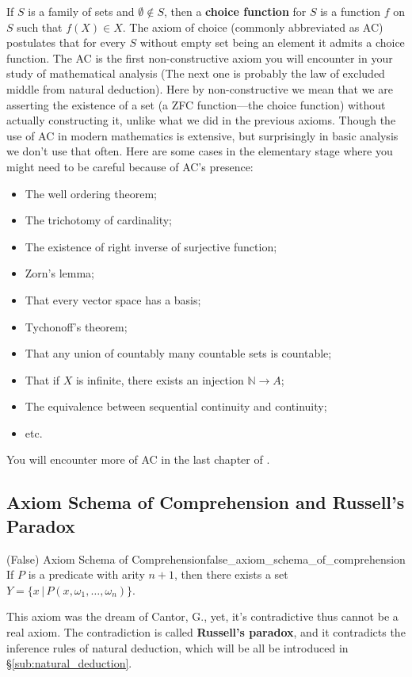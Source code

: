 \documentclass[../main.tex]{subfiles}
\begin{document}
If $S$ is a family of sets and $\emptyset\notin S$, then a \textbf{choice function} for $S$ is a function $f$ on $S$ such that $f(X)\in X$. The axiom of choice (commonly abbreviated as AC) postulates that for every $S$ without empty set being an element it admits a choice function. The AC is the first non-constructive axiom you will encounter in your study of mathematical analysis (The next one is probably the law of excluded middle from natural deduction). Here by non-constructive we mean that we are asserting the existence of a set (a ZFC function---the choice function) without actually constructing it, unlike what we did in the previous axioms. Though the use of AC in modern mathematics is extensive, but surprisingly in basic analysis we don't use that often. Here are some cases in the elementary stage where you might need to be careful because of AC's presence:
\begin{itemize}
    \item The well ordering theorem;
    \item The trichotomy of cardinality;
    \item The existence of right inverse of surjective function;
    \item Zorn's lemma;
    \item That every vector space has a basis;
    \item Tychonoff's theorem;
    \item That any union of countably many countable sets is countable;
    \item That if $X$ is infinite, there exists an injection $\mathbb{N}\to A$;
    \item The equivalence between sequential continuity and continuity;
    \item etc.
\end{itemize}
You will encounter more of AC in the last chapter of \cite{babyrudin}.

\subsection{Axiom Schema of Comprehension and Russell's Paradox}
\begin{definition}{(False) Axiom Schema of Comprehension}{false_axiom_schema_of_comprehension}
If $P$ is a predicate with arity $n+1$, then there exists a set $Y=\{x\,|\,P(x,\omega_1,\dots,\omega_n)\}$.
\end{definition}
This axiom was the dream of Cantor, G., yet, it's contradictive thus cannot be a real axiom. The contradiction is called \textbf{Russell's paradox}, and it contradicts the inference rules of natural deduction, which will be all be introduced in \S\ref{sub:natural_deduction}.
\end{document}
